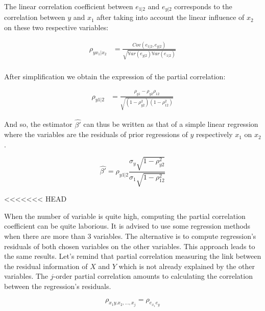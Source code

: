 \documentclass[
]{report}
\begin{document}
The linear correlation coefficient between \(e_{1|2}\) and \(e_{y|2}\) corresponds to the correlation between \(y\) and \(x_1\) after taking into account the linear influence of \(x_2\) on these two respective variables:

\begin{align*}
\rho_{yx_1|x_2}&=\frac{Cov(e_{1|2},e_{y|2})}{\sqrt{\mathbb{V}ar(e_{y|2})\mathbb{V}ar(e_{1|2})}}\\
\end{align*}

After simplification we obtain the expression of the partial correlation:

\begin{align*}
\rho_{y1|2}&=\frac{\rho_{y1}-\rho_{y2}\rho_{12}}{\sqrt{(1-\rho_{y2}^2)(1-\rho_{12}^2)}}
\end{align*}

And so, the estimator \(\hat{\beta'}\) can thus be written as that of a simple linear regression where the variables are the residuals of prior regressions of \(y\) respectively \(x_1\) on \(x_2\).

\[\hat{\beta'}=\rho_{y1|2}\frac{\sigma_y\sqrt{1-\rho_{y2}^2}}{\sigma_1\sqrt{1-\rho_{12}^2}}\]


\textless\textless\textless\textless\textless\textless\textless{} HEAD

When the number of variable is quite high, computing the partial correlation coefficient can be quite laborious. It is advised to use some regression methods when there are more than 3 variables. The alternative is to compute regression's residuals of both chosen variables on the other variables.
This approach leads to the same results. Let's remind that partial correlation measuring the link between the residual information of \(X\) and \(Y\) which is not already explained by the other variables.
The \(j\)-order partial correlation amounts to calculating the correlation between the regression's residuals.

\[\rho_{x_1y.x_2, \ldots, x_j} = \rho_{e_{x_1}e_y}\]
\end{document}
